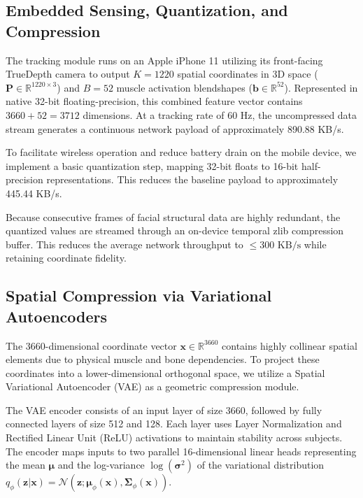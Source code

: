 \documentclass[sigconf]{acmart}
\begin{document}
\subsection{Embedded Sensing, Quantization, and Compression}
The tracking module runs on an Apple iPhone 11 utilizing its front-facing TrueDepth camera to output $K = 1220$ spatial coordinates in 3D space ($\mathbf{P} \in \mathbb{R}^{1220 \times 3}$) and $B = 52$ muscle activation blendshapes ($\mathbf{b} \in \mathbb{R}^{52}$). Represented in native 32-bit floating-precision, this combined feature vector contains $3660 + 52 = 3712$ dimensions. At a tracking rate of 60 Hz, the uncompressed data stream generates a continuous network payload of approximately 890.88 KB/s.

To facilitate wireless operation and reduce battery drain on the mobile device, we implement a basic quantization step, mapping 32-bit floats to 16-bit half-precision representations. This reduces the baseline payload to approximately 445.44 KB/s. 

Because consecutive frames of facial structural data are highly redundant, the quantized values are streamed through an on-device temporal zlib compression buffer. This reduces the average network throughput to $\le 300 \text{ KB/s}$ while retaining coordinate fidelity.

\subsection{Spatial Compression via Variational Autoencoders}
The 3660-dimensional coordinate vector $\mathbf{x} \in \mathbb{R}^{3660}$ contains highly collinear spatial elements due to physical muscle and bone dependencies. To project these coordinates into a lower-dimensional orthogonal space, we utilize a Spatial Variational Autoencoder (VAE) as a geometric compression module.

The VAE encoder consists of an input layer of size 3660, followed by fully connected layers of size 512 and 128. Each layer uses Layer Normalization and Rectified Linear Unit (ReLU) activations to maintain stability across subjects. The encoder maps inputs to two parallel 16-dimensional linear heads representing the mean $\boldsymbol{\mu}$ and the log-variance $\log(\boldsymbol{\sigma}^2)$ of the variational distribution $q_\phi(\mathbf{z}|\mathbf{x}) = \mathcal{N}(\mathbf{z}; \boldsymbol{\mu}_\phi(\mathbf{x}), \boldsymbol{\Sigma}_\phi(\mathbf{x}))$.
\end{document}
